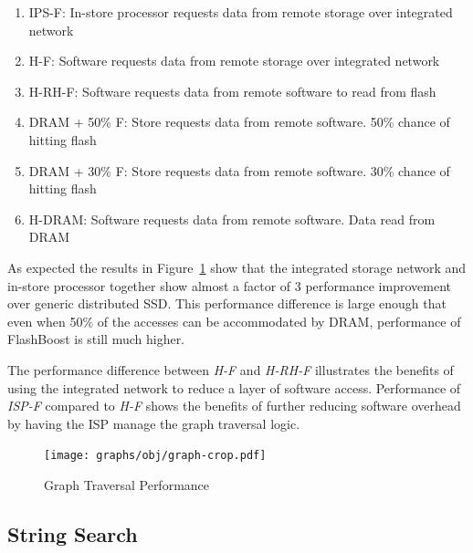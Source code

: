\begin{enumerate}
\item IPS-F:  In-store processor requests data from remote storage over integrated network
\item H-F:  Software requests data from remote storage over integrated network 
\item H-RH-F:  Software requests data from remote software to read from flash
\item DRAM + 50\% F:  Store requests data from remote software. 50\% chance of hitting flash
\item DRAM + 30\% F:  Store requests data from remote software. 30\% chance of hitting flash
\item H-DRAM:  Software requests data from remote software. Data read from DRAM 
\end{enumerate}

As expected the results in Figure~\ref{fig:result_graph} show that the integrated storage network and in-store processor together show almost a factor of 3 performance improvement over generic distributed SSD. This performance difference is large enough that even when 50\% of the accesses can be accommodated by DRAM, performance of FlashBoost is still much higher.

The performance difference between \emph{H-F} and \emph{H-RH-F} illustrates the benefits of using the integrated network to reduce a layer of software access. Performance of \emph{ISP-F} compared to \emph{H-F} shows the benefits of further reducing software overhead by having the ISP manage the graph traversal logic. 
	
\begin{figure}[t]
	\centering
	\texttt{[image: graphs/obj/graph-crop.pdf]}
	\caption{Graph Traversal Performance}
	\label{fig:result_graph}
\end{figure}

%

\subsection{String Search}

